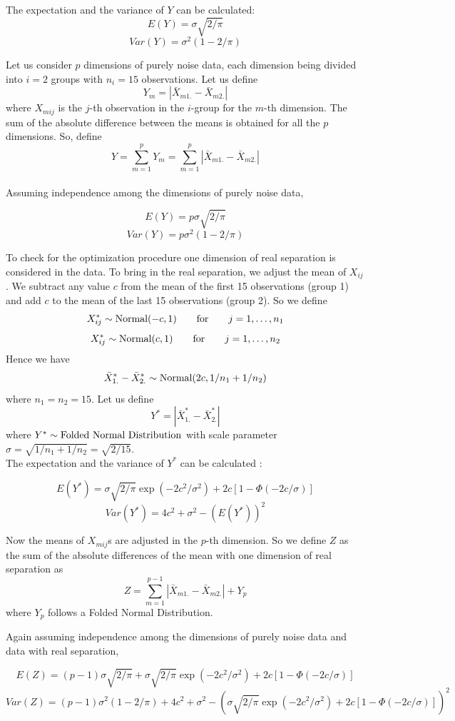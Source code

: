 The expectation and the variance of $Y$ can be calculated: 
$$E(Y) = \sigma \sqrt{2/\pi}$$
$$Var(Y) = \sigma^2 (1 - 2/\pi)$$

Let us consider $p$ dimensions of purely noise data, each dimension being divided into $i = 2$ groups with $n_i = 15$ observations. Let us define $$Y_m = |\bar{X}_{m1.} - \bar{X}_{m2.}|$$ where $X_{mij}$ is the $j$-th observation in the $i$-group for the $m$-th dimension. The sum of the absolute difference between the means is obtained for all the $p$ dimensions. So, define $$Y = \sum_{m=1}^p Y_m = \sum_{m=1}^p |\bar{X}_{m1.} - \bar{X}_{m2.}| $$ \\

Assuming independence among the dimensions of purely noise data,

$$E(Y) = p \sigma \sqrt{2/\pi}$$
$$Var(Y) = p \sigma^2 (1 - 2/\pi)$$

To check for the optimization procedure one dimension of real separation is considered in the data. To bring in the real separation, we adjust the mean of $X_{ij}$. We subtract any value $c$ from the mean of the first 15 observations (group 1) and add $c$ to the mean of the last 15 observations (group 2). So we define
$$X_{ij}^* \sim \hbox{Normal}(- c, 1) \qquad \hbox{for} \qquad j = 1, \dots, n_1$$
$$X_{ij}^* \sim \hbox{Normal}(c, 1) \qquad \hbox{for} \qquad j = 1, \dots, n_2$$ 
Hence we have $$\bar{X}_{1.}^* - \bar{X}_{2.}^* \sim \hbox{Normal}(2c, 1/n_1 + 1/n_2)$$ where $n_1 = n_2 = 15$. Let us define $$Y^*  = |\bar{X}_{1.}^* - \bar{X}_{2.}^*|$$ where $Y^* \sim \hbox{Folded Normal Distribution}$ with scale parameter $ \sigma = \sqrt{1/n_1 + 1/n_2} = \sqrt{2/15}$.  \\

The expectation and the variance of $Y^*$ can be calculated :

$$E(Y^*) = \sigma \sqrt{2/\pi} \exp(- 2c^2/\sigma^2) + 2c[1 - \Phi(-2c/\sigma)]$$
$$Var(Y^*) = 4c^2 + \sigma^2 - (E(Y^*))^2$$


Now the means of $X_{mij}$s are adjusted in the $p$-th dimension. So we define $Z$ as the sum of the absolute differences of the mean with one dimension of real separation as $$Z = \sum_{m=1}^{p-1} |\bar{X}_{m1.} - \bar{X}_{m2.}| + Y_p$$ where $Y_p$ follows a Folded Normal Distribution.

Again assuming independence among the dimensions of purely noise data and data with real separation,

$$E(Z) = (p - 1) \sigma \sqrt{2/\pi} + \sigma \sqrt{2/\pi} \exp(- 2c^2/\sigma^2) + 2c[1 - \Phi(-2c/\sigma)]$$
$$Var(Z) = (p - 1)\sigma^2 (1 - 2/\pi) + 4c^2 + \sigma^2 - \left( \sigma \sqrt{2/\pi} \exp(- 2c^2/\sigma^2) + 2c[1 - \Phi(-2c/\sigma)]\right)^2$$

